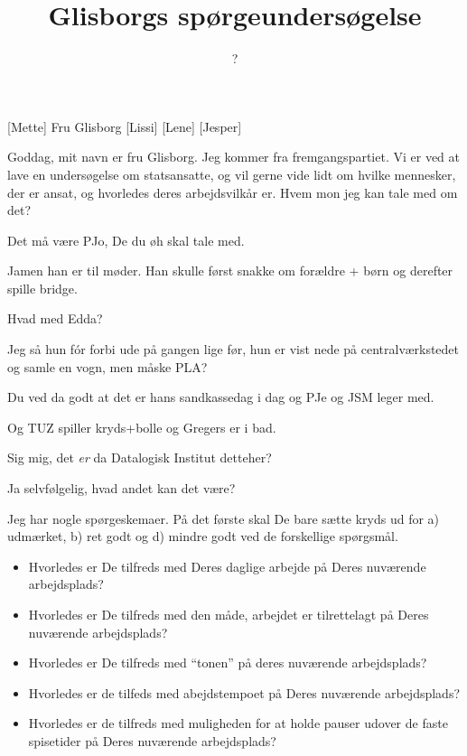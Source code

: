 \documentclass[a4paper,11pt]{article}
\title{Glisborgs spørgeundersøgelse}
\author{?}
\begin{document}
\maketitle

\begin{roles}
[Mette] Fru Glisborg
[Lissi]
[Lene]
[Jesper]
\end{roles}

\begin{sketch}
   Goddag, mit navn er fru Glisborg.  Jeg kommer fra
  fremgangspartiet.  Vi er ved at lave en undersøgelse om
  statsansatte, og vil gerne vide lidt om hvilke mennesker, der er
  ansat, og hvorledes deres arbejdsvilkår er.  Hvem mon jeg kan tale
  med om det?

   Det må være PJo, De du øh skal tale med.

   Jamen han er til møder.  Han skulle først snakke om
  forældre + børn og derefter spille bridge.

   Hvad med Edda?

   Jeg så hun fór forbi ude på gangen lige før, hun er vist
  nede på centralværkstedet og samle en vogn, men måske PLA?

   Du ved da godt at det er hans sandkassedag i dag og PJe og
  JSM leger med.

   Og TUZ spiller kryds+bolle og Gregers er i bad.

   Sig mig, det {\em er} da Datalogisk Institut detteher?

   Ja selvfølgelig, hvad andet kan det være?

   Jeg har nogle spørgeskemaer.  På det første skal De bare
  sætte kryds ud for a) udmærket, b) ret godt og d) mindre godt ved de
  forskellige spørgsmål.


\begin{itemize}
\item Hvorledes er De tilfreds med Deres daglige arbejde på Deres
  nuværende arbejdsplads?
\item Hvorledes er De tilfreds med den måde, arbejdet er tilrettelagt
  på Deres nuværende arbejdsplads?
\item Hvorledes er De tilfreds med "`tonen"' på deres nuværende arbejdsplads?
\item Hvorledes er de tilfeds med abejdstempoet på Deres nuværende arbejdsplads?
\item Hvorledes er de tilfreds med muligheden for at holde pauser
  udover de faste spisetider på Deres nuværende arbejdsplads?
\end{itemize}


\end{sketch}
\end{document}
